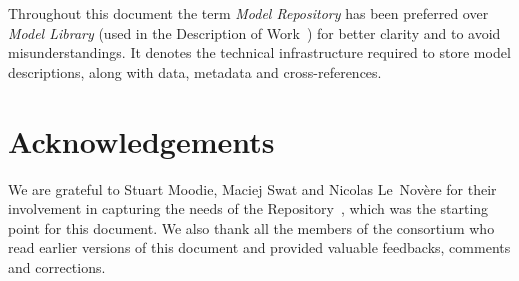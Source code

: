 \documentclass[11pt,a4paper]{article}
\begin{document}
Throughout this document the term \emph{Model Repository} has been preferred over \emph{Model Library} (used in the Description of Work~\cite{ddmore:dow}) for better clarity and to avoid misunderstandings. It denotes the technical infrastructure required to store model descriptions, along with data, metadata and cross-references.


\section*{Acknowledgements}
 We are grateful to Stuart Moodie, Maciej Swat and  Nicolas Le~Nov{\`e}re for their involvement in capturing the needs of the Repository~\cite{mli:req}, which was the starting point for this document. We also thank all the members of the consortium who read earlier versions of this document and provided valuable feedbacks, comments and corrections.

\clearpage
{}
\setcounter{page}{1}
\tableofcontents
\listoffigures
\clearpage

\printglossaries
\clearpage











%
\clearpage


\end{document}
